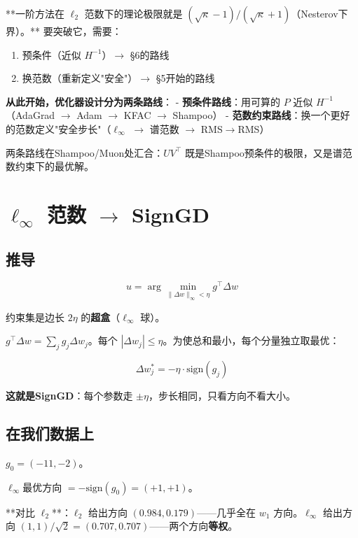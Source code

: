 \documentclass[12pt,a4paper]{article}
\begin{document}
**一阶方法在 $\ell_2$ 范数下的理论极限就是 $(\sqrt\kappa-1)/(\sqrt\kappa+1)$（Nesterov下界）。** 要突破它，需要：
\begin{enumerate}[leftmargin=*,nosep]
\item 预条件（近似 $H^{-1}$）$\to$ §6的路线
\item 换范数（重新定义"安全"）$\to$ §5开始的路线
\end{enumerate}






\begin{insightbox}
\textbf{从此开始，优化器设计分为两条路线}：
- \textbf{预条件路线}：用可算的 $P$ 近似 $H^{-1}$（AdaGrad $\to$ Adam $\to$ KFAC $\to$ Shampoo）
- \textbf{范数约束路线}：换一个更好的范数定义"安全步长"（$\ell_\infty$ $\to$ 谱范数 $\to$ RMS$\to$RMS）

两条路线在Shampoo/Muon处汇合：$UV^\top$ 既是Shampoo预条件的极限，又是谱范数约束下的最优解。
\end{insightbox}





\section{$\ell_\infty$ 范数 $\to$ SignGD}


\subsection{推导}


\[u = \arg\min_{\|\Delta w\|_\infty < \eta} g^\top \Delta w\]

约束集是边长 $2\eta$ 的\textbf{超盒}（$\ell_\infty$ 球）。

$g^\top \Delta w = \sum_j g_j \Delta w_j$。每个 $|\Delta w_j| \le \eta$。为使总和最小，每个分量独立取最优：


\[\Delta w_j^* = -\eta \cdot \text{sign}(g_j)\]

\textbf{这就是SignGD}：每个参数走 $\pm\eta$，步长相同，只看方向不看大小。


\subsection{在我们数据上}

$g_0 = (-11, -2)$。

$\ell_\infty$最优方向 $= -\text{sign}(g_0) = (+1, +1)$。

**对比 $\ell_2$**：$\ell_2$ 给出方向 $(0.984, 0.179)$——几乎全在 $w_1$ 方向。$\ell_\infty$ 给出方向 $(1, 1)/\sqrt{2} = (0.707, 0.707)$——两个方向\textbf{等权}。
\end{document}
